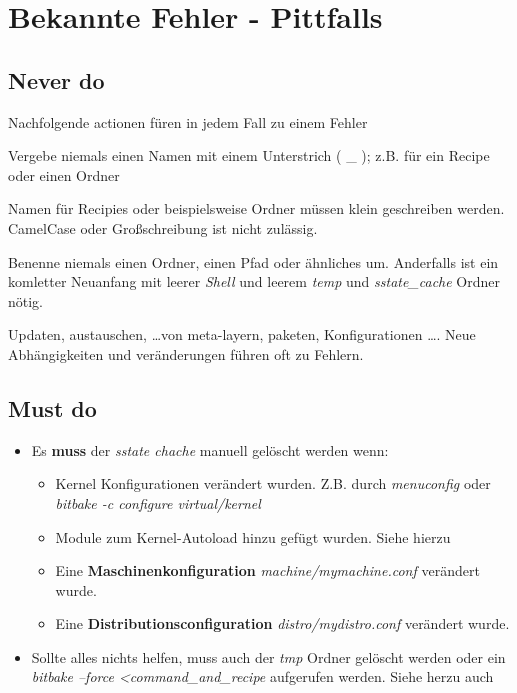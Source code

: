 
\chapter{Bekannte Fehler - Pittfalls}%
\label{cha:bekannte_fehler}


\section{Never do}%
\label{sec:Never_do}

Nachfolgende actionen füren in jedem Fall zu einem Fehler

\begin{description}
    \item[Unterstrich \glqq \_ \grqq im Namen]  Vergebe niemals einen Namen mit
        einem Unterstrich ( \_ ); z.B. für ein Recipe oder einen Ordner
    \item[kein CamelCase] Namen für Recipies oder beispielsweise Ordner müssen
        klein geschreiben werden. CamelCase oder Großschreibung ist nicht
        zulässig.
    \item[Umbenennung von Dateien oder Pfaden] Benenne niemals einen Ordner,
        einen Pfad oder ähnliches um. Anderfalls ist ein komletter Neuanfang mit
        leerer \textit{Shell} und leerem \textit{temp}
        und \textit{sstate\_cache} Ordner nötig.
    \item Updaten, austauschen, \ldots von meta-layern, paketen, Konfigurationen
        \ldots. Neue Abhängigkeiten und veränderungen führen oft zu Fehlern.
\end{description}


\section{Must do}%
\label{sec:must_do}

\begin{itemize}
    \item Es \textbf{muss} der \textit{sstate chache} manuell gelöscht werden
        wenn:
        \begin{itemize}
            \item Kernel Konfigurationen verändert wurden. Z.B. durch
                \textit{menuconfig} oder \textit{bitbake -c configure virtual/kernel}
            \item Module zum Kernel-Autoload hinzu gefügt wurden. Siehe hierzu
            \item Eine \textbf{Maschinenkonfiguration}
                \textit{machine/mymachine.conf} verändert wurde.
            \item Eine \textbf{Distributionsconfiguration}
                \textit{distro/mydistro.conf} verändert wurde.
        \end{itemize}
    \item Sollte alles nichts helfen, muss auch der \textit{tmp} Ordner gelöscht
        werden oder ein \textit{bitbake --force <command\_and\_recipe}
        aufgerufen werden. Siehe herzu auch 
\end{itemize}

